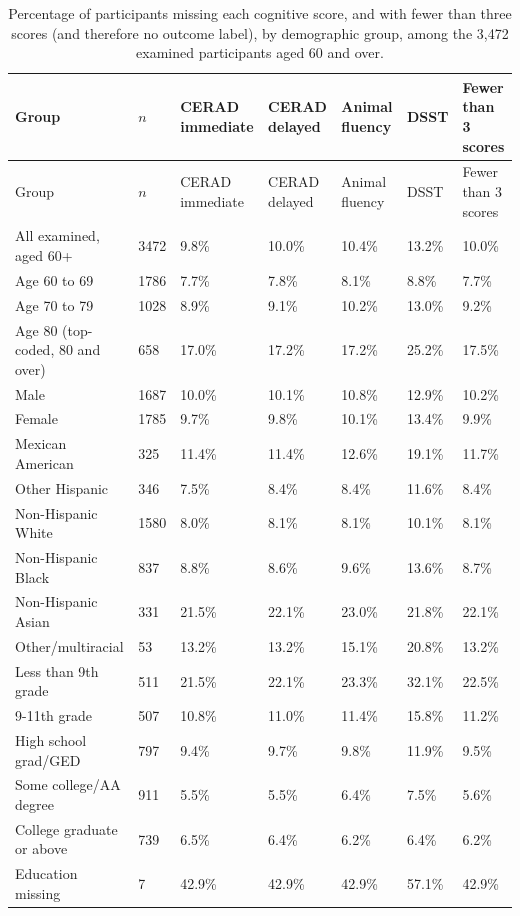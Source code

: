 \documentclass[11pt]{article}
\begin{document}
\begin{longtable}{L{4.2cm}R{0.9cm}R{1.6cm}R{1.6cm}R{1.6cm}R{1.5cm}R{1.8cm}}
\caption{Percentage of participants missing each cognitive score, and with fewer than three scores (and therefore no outcome label), by demographic group, among the 3,472 examined participants aged 60 and over.}\\
\toprule
Group & $n$ & CERAD immediate & CERAD delayed & Animal fluency & DSST & Fewer than 3 scores \\
\midrule
\endfirsthead
\toprule
Group & $n$ & CERAD immediate & CERAD delayed & Animal fluency & DSST & Fewer than 3 scores \\
\midrule
\endhead
\bottomrule
\endlastfoot
All examined, aged 60+ & 3472 & 9.8\% & 10.0\% & 10.4\% & 13.2\% & 10.0\% \\
Age 60 to 69 & 1786 & 7.7\% & 7.8\% & 8.1\% & 8.8\% & 7.7\% \\
Age 70 to 79 & 1028 & 8.9\% & 9.1\% & 10.2\% & 13.0\% & 9.2\% \\
Age 80 (top-coded, 80 and over) & 658 & 17.0\% & 17.2\% & 17.2\% & 25.2\% & 17.5\% \\
Male & 1687 & 10.0\% & 10.1\% & 10.8\% & 12.9\% & 10.2\% \\
Female & 1785 & 9.7\% & 9.8\% & 10.1\% & 13.4\% & 9.9\% \\
Mexican American & 325 & 11.4\% & 11.4\% & 12.6\% & 19.1\% & 11.7\% \\
Other Hispanic & 346 & 7.5\% & 8.4\% & 8.4\% & 11.6\% & 8.4\% \\
Non-Hispanic White & 1580 & 8.0\% & 8.1\% & 8.1\% & 10.1\% & 8.1\% \\
Non-Hispanic Black & 837 & 8.8\% & 8.6\% & 9.6\% & 13.6\% & 8.7\% \\
Non-Hispanic Asian & 331 & 21.5\% & 22.1\% & 23.0\% & 21.8\% & 22.1\% \\
Other/multiracial & 53 & 13.2\% & 13.2\% & 15.1\% & 20.8\% & 13.2\% \\
Less than 9th grade & 511 & 21.5\% & 22.1\% & 23.3\% & 32.1\% & 22.5\% \\
9-11th grade & 507 & 10.8\% & 11.0\% & 11.4\% & 15.8\% & 11.2\% \\
High school grad/GED & 797 & 9.4\% & 9.7\% & 9.8\% & 11.9\% & 9.5\% \\
Some college/AA degree & 911 & 5.5\% & 5.5\% & 6.4\% & 7.5\% & 5.6\% \\
College graduate or above & 739 & 6.5\% & 6.4\% & 6.2\% & 6.4\% & 6.2\% \\
Education missing & 7 & 42.9\% & 42.9\% & 42.9\% & 57.1\% & 42.9\% \\
\end{longtable}
\end{document}
